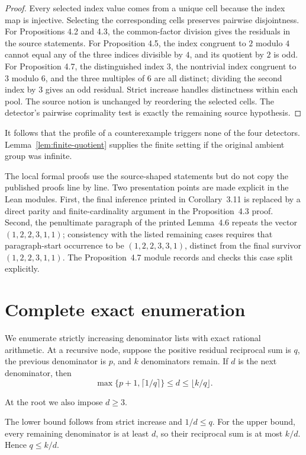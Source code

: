 \documentclass[11pt]{article}
\theoremstyle{definition}
\begin{document}
\begin{proof}
Every selected index value comes from a unique cell because the index map is
injective. Selecting the corresponding cells preserves pairwise disjointness.
For Propositions 4.2 and 4.3, the common-factor division gives the residuals
in the source statements. For Proposition 4.5, the index congruent to $2$
modulo $4$ cannot equal any of the three indices divisible by $4$, and its
quotient by $2$ is odd. For Proposition 4.7, the distinguished index $3$, the
nontrivial index congruent to $3$ modulo $6$, and the three multiples of $6$
are all distinct; dividing the second index by $3$ gives an odd residual.
Strict increase handles distinctness within each pool. The source notion is
unchanged by reordering the selected cells. The detector's pairwise
coprimality test is exactly the remaining source hypothesis.
\end{proof}

It follows that the profile of a counterexample triggers none of the four
detectors. Lemma~\ref{lem:finite-quotient} supplies the finite setting if the
original ambient group was infinite.

The local formal proofs use the source-shaped statements but do not copy the
published proofs line by line. Two presentation points are made explicit in
the Lean modules. First, the final inference printed in Corollary~3.11 is
replaced by a direct parity and finite-cardinality argument in the
Proposition~4.3 proof. Second, the penultimate paragraph of the printed
Lemma~4.6 repeats the vector $(1,2,2,3,1,1)$; consistency with the listed
remaining cases requires that paragraph-start occurrence to be
$(1,2,2,3,3,1)$, distinct from the final survivor
$(1,2,2,3,1,1)$. The Proposition~4.7 module records and checks this case split
explicitly.

\section{Complete exact enumeration}\label{sec:search}

We enumerate strictly increasing denominator lists with exact rational
arithmetic. At a recursive node, suppose the positive residual reciprocal sum
is $q$, the previous denominator is $p$, and $k$ denominators remain. If $d$
is the next denominator, then
\[
  \max\{p+1,\lceil 1/q\rceil\}
  \leq d\leq
  \lfloor k/q\rfloor.
  \tag{5.1}
\]

At the root we also impose $d\geq3$.

The lower bound follows from strict increase and $1/d\leq q$. For the upper
bound, every remaining denominator is at least $d$, so their reciprocal sum
is at most $k/d$. Hence $q\leq k/d$.
\end{document}
